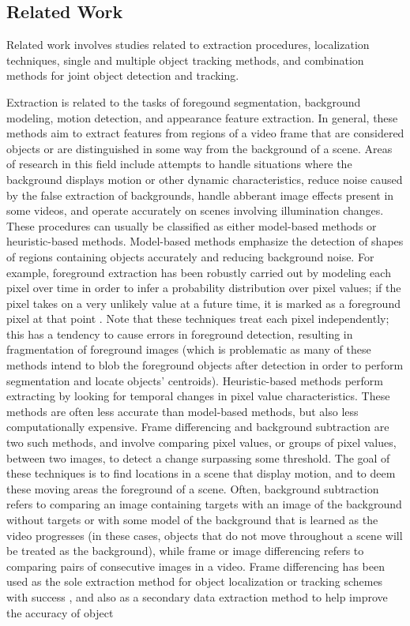 \documentclass[twocolumn, final]{svjour3}
\begin{document}

\subsection{Related Work}
\label{sec:relatedwork}

Related work involves studies related to extraction procedures, localization techniques, single and multiple object tracking methods, and combination methods for joint object detection and tracking.

Extraction is related to the tasks of foregound segmentation, background modeling, motion detection, and appearance feature extraction. In general, these methods aim to extract features from regions of a video frame that are considered objects or are distinguished in some way from the background of a scene. Areas of research in this field include attempts to handle situations where the background displays motion or other dynamic characteristics, reduce noise caused by the false extraction of backgrounds, handle abberant image effects present in some videos, and operate accurately on scenes involving illumination changes. These procedures can usually be classified as either model-based methods or heuristic-based methods. Model-based methods emphasize the detection of shapes of regions containing objects accurately and reducing background noise. For example, foreground extraction has been robustly carried out by modeling each pixel over time in order to infer a probability distribution over pixel values; if the pixel takes on a very unlikely value at a future time, it is marked as a foreground pixel at that point \citep{stauffer_1999, elgammal_2000, elgammal_2002}. Note that these techniques treat each pixel independently; this has a tendency to cause errors in foreground detection, resulting in fragmentation of foreground images (which is problematic as many of these methods intend to blob the foreground objects after detection in order to perform segmentation and locate objects' centroids). Heuristic-based methods perform extracting by looking for temporal changes in pixel value characteristics. These methods are often less accurate than model-based methods, but also less computationally expensive. Frame differencing and background subtraction are two such methods, and involve comparing pixel values, or groups of pixel values, between two images, to detect a change surpassing some threshold. The goal of these techniques is to find locations in a scene that display motion, and to deem these moving areas the foreground of a scene.  Often, background subtraction refers to comparing an image containing targets with an image of the background without targets or with some model of the background that is learned as the video progresses (in these cases, objects that do not move throughout a scene will be treated as the background), while frame or image differencing refers to comparing pairs of consecutive images in a video. Frame differencing has been used as the sole extraction method for object localization or tracking schemes with success \citep{pece_2002, beleznai_2006, chu_2007}, and also as a secondary data extraction method to help improve the accuracy of object 
\end{document}
